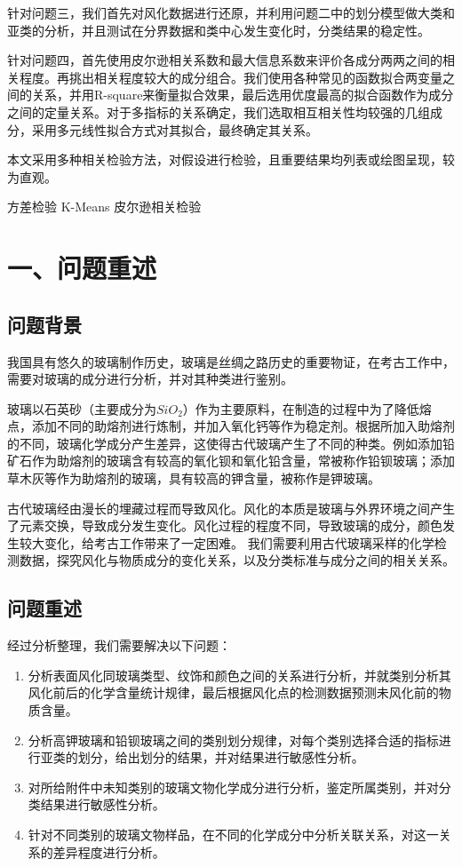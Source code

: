 \documentclass{my_paper}
\begin{document}
针对问题三，我们首先对风化数据进行还原，并利用问题二中的划分模型做大类和亚类的分析，并且测试在分界数据和类中心发生变化时，分类结果的稳定性。

针对问题四，首先使用皮尔逊相关系数和最大信息系数来评价各成分两两之间的相关程度。再挑出相关程度较大的成分组合。我们使用各种常见的函数拟合两变量之间的关系，并用R-square来衡量拟合效果，最后选用优度最高的拟合函数作为成分之间的定量关系。对于多指标的关系确定，我们选取相互相关性均较强的几组成分，采用多元线性拟合方式对其拟合，最终确定其关系。

本文采用多种相关检验方法，对假设进行检验，且重要结果均列表或绘图呈现，较为直观。

\begin{guanjianci}
 方差检验 \quad K-Means \quad 皮尔逊相关检验
\end{guanjianci}

\newpage
\section{一、问题重述}

\subsection{问题背景}

我国具有悠久的玻璃制作历史，玻璃是丝绸之路历史的重要物证，在考古工作中，需要对玻璃的成分进行分析，并对其种类进行鉴别。

玻璃以石英砂（主要成分为$SiO_2$）作为主要原料，在制造的过程中为了降低熔点，添加不同的助熔剂进行炼制，并加入氧化钙等作为稳定剂。根据所加入助熔剂的不同，玻璃化学成分产生差异，这使得古代玻璃产生了不同的种类。例如添加铅矿石作为助熔剂的玻璃含有较高的氧化钡和氧化铅含量，常被称作铅钡玻璃；添加草木灰等作为助熔剂的玻璃，具有较高的钾含量，被称作是钾玻璃。

古代玻璃经由漫长的埋藏过程而导致风化。风化的本质是玻璃与外界环境之间产生了元素交换，导致成分发生变化。风化过程的程度不同，导致玻璃的成分，颜色发生较大变化，给考古工作带来了一定困难。
我们需要利用古代玻璃采样的化学检测数据，探究风化与物质成分的变化关系，以及分类标准与成分之间的相关关系。

\subsection{问题重述}
经过分析整理，我们需要解决以下问题：
\begin{enumerate}
    \item 分析表面风化同玻璃类型、纹饰和颜色之间的关系进行分析，并就类别分析其风化前后的化学含量统计规律，最后根据风化点的检测数据预测未风化前的物质含量。
    \item 分析高钾玻璃和铅钡玻璃之间的类别划分规律，对每个类别选择合适的指标进行亚类的划分，给出划分的结果，并对结果进行敏感性分析。
    \item 对所给附件中未知类别的玻璃文物化学成分进行分析，鉴定所属类别，并对分类结果进行敏感性分析。
    \item 针对不同类别的玻璃文物样品，在不同的化学成分中分析关联关系，对这一关系的差异程度进行分析。
\end{enumerate}
\end{document}
